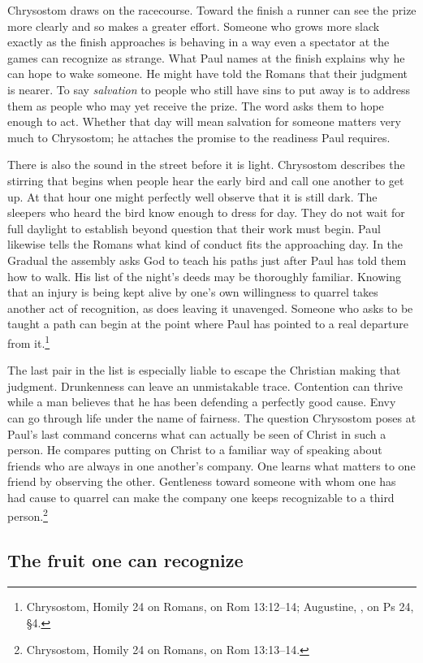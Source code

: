 Chrysostom draws on the racecourse. Toward the finish a runner can see the prize more clearly and so makes a greater effort. Someone who grows more slack exactly as the finish approaches is behaving in a way even a spectator at the games can recognize as strange. What Paul names at the finish explains why he can hope to wake someone. He might have told the Romans that their judgment is nearer. To say \emph{salvation} to people who still have sins to put away is to address them as people who may yet receive the prize. The word asks them to hope enough to act. Whether that day will mean salvation for someone matters very much to Chrysostom; he attaches the promise to the readiness Paul requires.

There is also the sound in the street before it is light. Chrysostom describes the stirring that begins when people hear the early bird and call one another to get up. At that hour one might perfectly well observe that it is still dark. The sleepers who heard the bird know enough to dress for day. They do not wait for full daylight to establish beyond question that their work must begin. Paul likewise tells the Romans what kind of conduct fits the approaching day. In the Gradual the assembly asks God to teach his paths just after Paul has told them how to walk. His list of the night's deeds may be thoroughly familiar. Knowing that an injury is being kept alive by one's own willingness to quarrel takes another act of recognition, as does leaving it unavenged. Someone who asks to be taught a path can begin at the point where Paul has pointed to a real departure from it.\footnote{Chrysostom, Homily 24 on Romans, on Rom 13:12--14; Augustine, , on Ps 24, §4.}

The last pair in the list is especially liable to escape the Christian making that judgment. Drunkenness can leave an unmistakable trace. Contention can thrive while a man believes that he has been defending a perfectly good cause. Envy can go through life under the name of fairness. The question Chrysostom poses at Paul's last command concerns what can actually be seen of Christ in such a person. He compares putting on Christ to a familiar way of speaking about friends who are always in one another's company. One learns what matters to one friend by observing the other. Gentleness toward someone with whom one has had cause to quarrel can make the company one keeps recognizable to a third person.\footnote{Chrysostom, Homily 24 on Romans, on Rom 13:13--14.}

\subsection{The fruit one can recognize}

